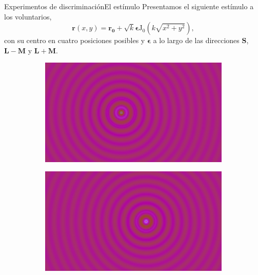 \documentclass[
    11pt, %
    aspectratio=169, %
]{beamer}
\begin{document}
\begin{frame}{Experimentos de discriminación}{El estímulo}
Presentamos el siguiente estímulo a los voluntarios,
\begin{equation*}
     \mathbf{r}(x,y) = \mathbf{r_0} + \sqrt{k}\bm{\epsilon}\text{J}_0\left(k\sqrt{x^2+y^2}\right),
\end{equation*}
con su centro en cuatro posiciones posibles y $\bm{\epsilon}$ a lo largo de las direcciones $\mathbf{S}$, $\mathbf{L-M}$ y $\mathbf{L+M}$.
\begin{center}
    \begin{figure}[h]
     \centering
     \begin{subfigure}[b]{0.24\textwidth}
         \centering
         \includegraphics[width=\textwidth]{Images/experimental/izquierda_charla.png}
         \label{fig:y equals x}
     \end{subfigure}
     \hfill
     \begin{subfigure}[b]{0.24\textwidth}
         \centering
         \includegraphics[width=\textwidth]{Images/experimental/derecha_charla.png}

\end{subfigure}
\end{figure}
\end{center}
\end{frame}
\end{document}
